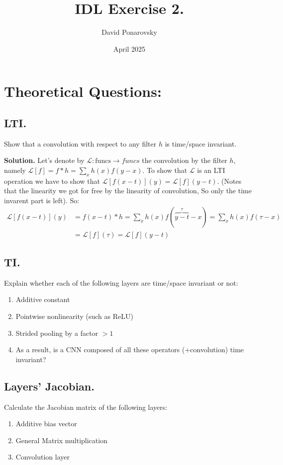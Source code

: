 \documentclass{article}
\title{IDL Exercise 2.}
\author{David Ponarovsky}
\date{April 2025}
\begin{document}
\maketitle

\section{Theoretical Questions:}

\subsection{LTI.} Show that a convolution with respect to any filter $h$ is time/space invariant.


\textbf{Solution.} Let's denote by $\mathcal{L} : \text{funcs} \rightarrow {funcs}$ the convolution by the filter $h$, namely $\mathcal{L}[f] = f*h = \sum_{x}{h(x)f(y-x)}$. To show that $\mathcal{L}$ is an LTI operation we have to show that $\mathcal{L}[f(x-t)](y) = \mathcal{L}[f](y-t)$. (Notes that the linearity we got for free by the linearity of convolution, So only the time invarent part is left). So: 
\begin{equation*}
    \begin{split}
      \mathcal{L}[f(x-t)](y) &=  f(x-t)*h = \sum_{x}{h(x)f( \overbrace{y-t}^{\tau}-x)} = \sum_{x}{h(x)f(\tau-x)}\\
      &= \mathcal{L}[f](\tau) = \mathcal{L}[f](y-t)
    \end{split}
\end{equation*}

 
\subsection{TI.} Explain whether each of the following layers are time/space invariant or not:
\begin{enumerate}
  \item Additive constant
  \item Pointwise nonlinearity (such as ReLU)
  \item Strided pooling by a factor $ > 1 $
  \item As a result, is a CNN composed of all these operators (+convolution) time invariant?
\end{enumerate}

\subsection{Layers’ Jacobian.} Calculate the Jacobian matrix of the following layers:
\begin{enumerate}
  \item Additive bias vector
  \item General Matrix multiplication
  \item Convolution layer
\end{enumerate}
\end{document}

